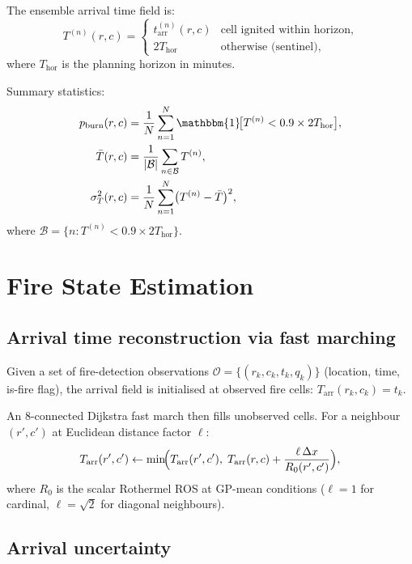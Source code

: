 \documentclass[11pt,twocolumn]{article}
\begin{document}
The ensemble arrival time field is:
\begin{equation}
  T^{(n)}(r,c) =
  \begin{cases}
    t^{(n)}_{\mathrm{arr}}(r,c) & \text{cell ignited within horizon},\\
    2T_{\mathrm{hor}} & \text{otherwise (sentinel)},
  \end{cases}\label{eq:Tn}
\end{equation}
where $T_{\mathrm{hor}}$ is the planning horizon in minutes.

Summary statistics:
\begin{align}
  p_{\mathrm{burn}}(r,c) &= \frac{1}{N}\sum_{n=1}^N
    \mathbbm{1}\!\bigl[T^{(n)}<0.9\times2T_{\mathrm{hor}}\bigr],\label{eq:pburn}\\
  \bar{T}(r,c) &= \frac{1}{|\mathcal{B}|}\sum_{n\in\mathcal{B}} T^{(n)},\label{eq:Tbar}\\
  \sigma^2_T(r,c) &= \frac{1}{N}\sum_{n=1}^N \bigl(T^{(n)}-\bar{T}\bigr)^2,\label{eq:varT}
\end{align}
where $\mathcal{B}=\{n: T^{(n)}<0.9\times2T_{\mathrm{hor}}\}$.

\section{Fire State Estimation}
\label{sec:firestate}

\subsection{Arrival time reconstruction via fast marching}

Given a set of fire-detection observations
$\mathcal{O}=\{(r_k,c_k,t_k,q_k)\}$ (location, time, is-fire flag),
the arrival field is initialised at observed fire cells:
$T_{\mathrm{arr}}(r_k,c_k)=t_k$.

An 8-connected Dijkstra fast march then fills unobserved cells.  For
a neighbour $(r',c')$ at Euclidean distance factor $\ell$:
\begin{equation}
  T_{\mathrm{arr}}(r',c') \leftarrow
  \min\!\Bigl(T_{\mathrm{arr}}(r',c'),\;T_{\mathrm{arr}}(r,c)
  + \frac{\ell\,\Delta x}{R_0(r',c')}\Bigr),\label{eq:fm}
\end{equation}
where $R_0$ is the scalar Rothermel ROS at GP-mean conditions
($\ell=1$ for cardinal, $\ell=\sqrt{2}$ for diagonal neighbours).

\subsection{Arrival uncertainty}
\end{document}
